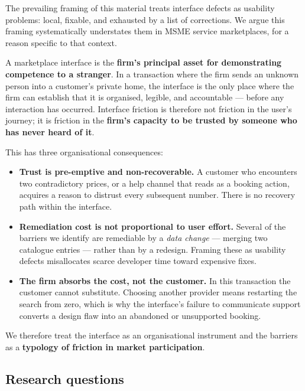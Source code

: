 \documentclass[]{interact}
\theoremstyle{plain}
\begin{document}
The prevailing framing of this material treats interface defects as usability problems: local, fixable,
and exhausted by a list of corrections. We argue this framing systematically understates them in MSME
service marketplaces, for a reason specific to that context.

A marketplace interface is the \textbf{firm's principal asset for demonstrating competence to a
stranger}. In a transaction where the firm sends an unknown person into a customer's private home, the
interface is the only place where the firm can establish that it is organised, legible, and
accountable --- before any interaction has occurred. Interface friction is therefore not friction in
the user's journey; it is friction in the \textbf{firm's capacity to be trusted by someone who has
never heard of it}.

This has three organisational consequences:

\begin{itemize}
\item \textbf{Trust is pre-emptive and non-recoverable.} A customer who encounters two contradictory
      prices, or a help channel that reads as a booking action, acquires a reason to distrust every
      subsequent number. There is no recovery path within the interface.
\item \textbf{Remediation cost is not proportional to user effort.} Several of the barriers we identify
      are remediable by a \emph{data change} --- merging two catalogue entries --- rather than by a
      redesign. Framing these as usability defects misallocates scarce developer time toward expensive
      fixes.
\item \textbf{The firm absorbs the cost, not the customer.} In this transaction the customer cannot
      substitute. Choosing another provider means restarting the search from zero, which is why the
      interface's failure to communicate support converts a design flaw into an abandoned or
      unsupported booking.
\end{itemize}

We therefore treat the interface as an organisational instrument and the barriers as a \textbf{typology
of friction in market participation}.

\subsection{Research questions}
\end{document}
